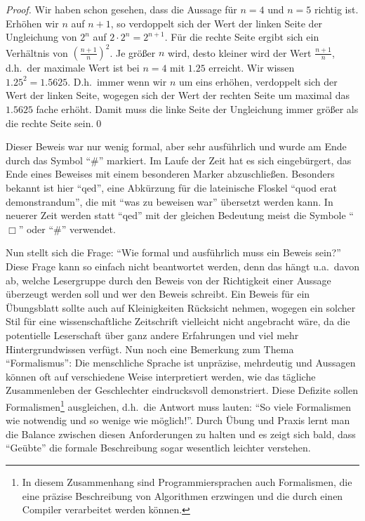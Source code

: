 \begin{proof}

Wir haben schon gesehen, dass die Aussage für $n = 4$ und $n = 5$
richtig ist. Erhöhen wir $n$ auf $n + 1$, so verdoppelt sich der Wert
der linken Seite der Ungleichung von $2^n$ auf $2 \cdot 2^n =
2^{n+1}$. Für die rechte Seite ergibt sich ein Verhältnis von
$(\frac{n+1}{n})^2$. Je größer $n$ wird, desto kleiner wird der Wert
$\frac{n+1}{n}$, d.h.~der maximale Wert ist bei $n = 4$ mit $1.25$
erreicht. Wir wissen $1.25^2 = 1.5625$. D.h.~immer wenn wir $n$ um
eins erhöhen, verdoppelt sich der Wert der linken Seite, wogegen sich
der Wert der rechten Seite um maximal das $1.5625$ fache erhöht. Damit
muss die linke Seite der Ungleichung immer größer als die rechte Seite
sein.\qed
\end{proof}

\bigskip

Dieser Beweis war nur wenig formal, aber sehr ausführlich und wurde
am Ende durch das Symbol "`$\#$"' markiert. Im Laufe der Zeit
hat es sich eingebürgert, das Ende eines Beweises mit einem besonderen
Marker abzuschließen.  Besonders bekannt ist hier
"`$\mathrm{qed}$"', eine Abkürzung für die
lateinische Floskel "`quod erat demonstrandum"', die mit "`was zu
beweisen war"' übersetzt werden kann. In neuerer Zeit werden statt
"`$\mathrm{qed}$"' mit der gleichen Bedeutung meist die Symbole
"`$\Box$"' oder "`$\#$"' \index{$\#$}\index{$\Box$}
verwendet.

Nun stellt sich die Frage: "`Wie formal und ausführlich muss ein
Beweis sein?"' Diese Frage kann so einfach nicht beantwortet werden,
denn das hängt u.a.~davon ab, welche Lesergruppe durch den Beweis von
der Richtigkeit einer Aussage überzeugt werden soll und wer den Beweis
schreibt. Ein Beweis für ein Übungsblatt sollte auch auf Kleinigkeiten
Rücksicht nehmen, wogegen ein solcher Stil für eine wissenschaftliche
Zeitschrift vielleicht nicht angebracht wäre, da die potentielle
Leserschaft über ganz andere Erfahrungen und viel mehr
Hintergrundwissen verfügt. Nun noch eine Bemerkung zum Thema
"`Formalismus"': Die menschliche Sprache ist unpräzise, mehrdeutig und
Aussagen können oft auf verschiedene Weise interpretiert werden, wie das
tägliche Zusammenleben der Geschlechter eindrucksvoll demonstriert. Diese
Defizite sollen Formalismen\footnote{In diesem Zusammenhang sind
Programmiersprachen auch Formalismen, die eine präzise Beschreibung
von Algorithmen erzwingen und die durch einen Compiler verarbeitet
werden können.} ausgleichen, d.h.~die Antwort muss lauten: "`So viele
Formalismen wie notwendig und so wenige wie möglich!"'. Durch Übung
und Praxis lernt man die Balance zwischen diesen Anforderungen zu
halten und es zeigt sich bald, dass "`Geübte"' die formale
Beschreibung sogar wesentlich leichter verstehen.

